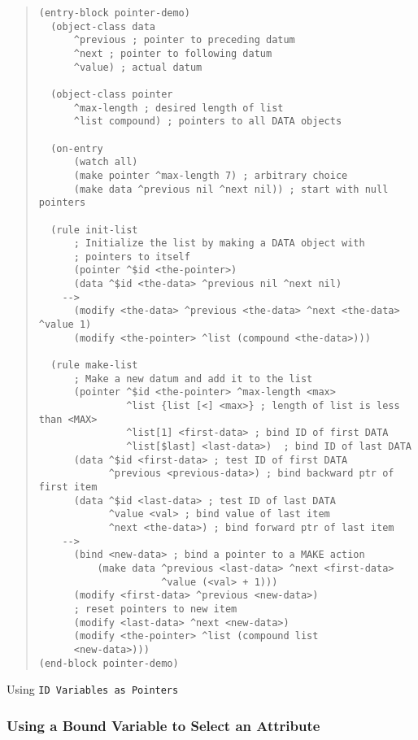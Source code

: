 \begin{example}[!h]
\renewcommand{\baselinestretch}{0.9}\normalsize
\begin{quote}
\begin{verbatim}
(entry-block pointer-demo)
  (object-class data
      ^previous ; pointer to preceding datum
      ^next ; pointer to following datum
      ^value) ; actual datum

  (object-class pointer
      ^max-length ; desired length of list
      ^list compound) ; pointers to all DATA objects

  (on-entry
      (watch all)
      (make pointer ^max-length 7) ; arbitrary choice
      (make data ^previous nil ^next nil)) ; start with null pointers

  (rule init-list
      ; Initialize the list by making a DATA object with  
      ; pointers to itself
      (pointer ^$id <the-pointer>)
      (data ^$id <the-data> ^previous nil ^next nil)
    -->
      (modify <the-data> ^previous <the-data> ^next <the-data> ^value 1)
      (modify <the-pointer> ^list (compound <the-data>)))

  (rule make-list
      ; Make a new datum and add it to the list
      (pointer ^$id <the-pointer> ^max-length <max>
               ^list {list [<] <max>} ; length of list is less than <MAX>
               ^list[1] <first-data> ; bind ID of first DATA
               ^list[$last] <last-data>)  ; bind ID of last DATA
      (data ^$id <first-data> ; test ID of first DATA
            ^previous <previous-data>) ; bind backward ptr of first item
      (data ^$id <last-data> ; test ID of last DATA
            ^value <val> ; bind value of last item
            ^next <the-data>) ; bind forward ptr of last item
    -->
      (bind <new-data> ; bind a pointer to a MAKE action
          (make data ^previous <last-data> ^next <first-data> 
                     ^value (<val> + 1)))
      (modify <first-data> ^previous <new-data>)
      ; reset pointers to new item
      (modify <last-data> ^next <new-data>)
      (modify <the-pointer> ^list (compound list
      <new-data>)))
(end-block pointer-demo)
\end{verbatim}
\end{quote}
\caption{Using \ct\tt{ID} Variables as Pointers}
\label{e:3-5}
\end{example}

\subsubsection*{Using a Bound Variable to Select an Attribute}

